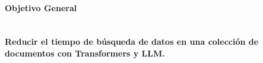\documentclass[../main.tex]{subfiles}
\begin{document}
%
%



\paragraph{Objetivo General} \hspace{0pt} \\
\textbf{Reducir el tiempo de búsqueda de datos en una colección de documentos con Transformers y LLM.}

\end{document}
